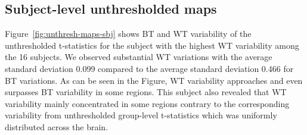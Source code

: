 \documentclass[conference]{IEEEtran}
\begin{document}
  \begin{figure}[ht]
  \end{figure}


  \subsection{Subject-level unthresholded maps}

  Figure~\ref{fig:unthresh-maps-sbj} shows BT and WT variability of the
  unthresholded t-statistics for the subject with the highest WT
  variability among the 16 subjects.
  We observed substantial WT variations with the average standard deviation 0.099 compared to 
  the average standard deviation 0.466 for BT variations.
  As can be seen in the Figure, WT variability approaches and even surpasses BT variability in some regions.
  This subject also revealed that WT variability mainly concentrated in some regions  
  contrary to the corresponding variability from unthresholded group-level t-statistics which was uniformly distributed across the brain.
\end{document}
